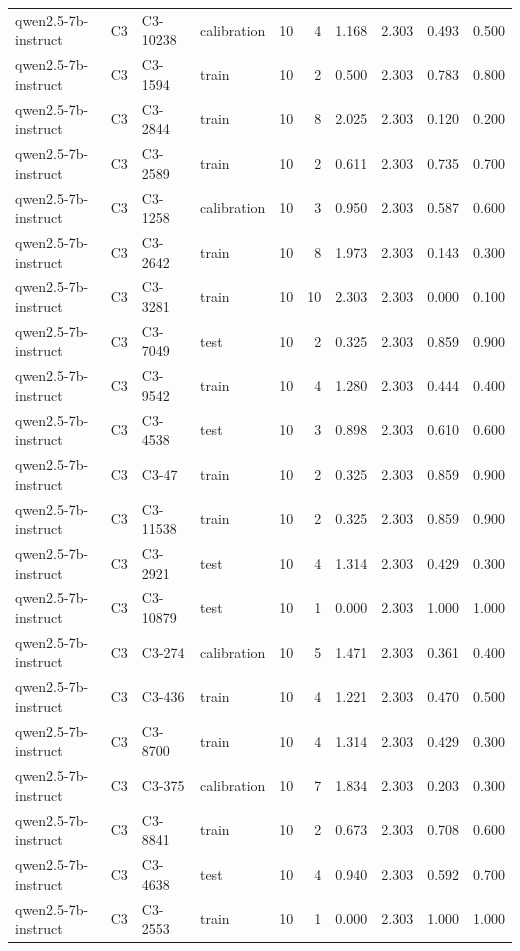 \begin{table}
\begin{tabular}{llllrrrrrr}
qwen2.5-7b-instruct & C3 & C3-10238 & calibration & 10 & 4 & 1.168 & 2.303 & 0.493 & 0.500 \\
qwen2.5-7b-instruct & C3 & C3-1594 & train & 10 & 2 & 0.500 & 2.303 & 0.783 & 0.800 \\
qwen2.5-7b-instruct & C3 & C3-2844 & train & 10 & 8 & 2.025 & 2.303 & 0.120 & 0.200 \\
qwen2.5-7b-instruct & C3 & C3-2589 & train & 10 & 2 & 0.611 & 2.303 & 0.735 & 0.700 \\
qwen2.5-7b-instruct & C3 & C3-1258 & calibration & 10 & 3 & 0.950 & 2.303 & 0.587 & 0.600 \\
qwen2.5-7b-instruct & C3 & C3-2642 & train & 10 & 8 & 1.973 & 2.303 & 0.143 & 0.300 \\
qwen2.5-7b-instruct & C3 & C3-3281 & train & 10 & 10 & 2.303 & 2.303 & 0.000 & 0.100 \\
qwen2.5-7b-instruct & C3 & C3-7049 & test & 10 & 2 & 0.325 & 2.303 & 0.859 & 0.900 \\
qwen2.5-7b-instruct & C3 & C3-9542 & train & 10 & 4 & 1.280 & 2.303 & 0.444 & 0.400 \\
qwen2.5-7b-instruct & C3 & C3-4538 & test & 10 & 3 & 0.898 & 2.303 & 0.610 & 0.600 \\
qwen2.5-7b-instruct & C3 & C3-47 & train & 10 & 2 & 0.325 & 2.303 & 0.859 & 0.900 \\
qwen2.5-7b-instruct & C3 & C3-11538 & train & 10 & 2 & 0.325 & 2.303 & 0.859 & 0.900 \\
qwen2.5-7b-instruct & C3 & C3-2921 & test & 10 & 4 & 1.314 & 2.303 & 0.429 & 0.300 \\
qwen2.5-7b-instruct & C3 & C3-10879 & test & 10 & 1 & 0.000 & 2.303 & 1.000 & 1.000 \\
qwen2.5-7b-instruct & C3 & C3-274 & calibration & 10 & 5 & 1.471 & 2.303 & 0.361 & 0.400 \\
qwen2.5-7b-instruct & C3 & C3-436 & train & 10 & 4 & 1.221 & 2.303 & 0.470 & 0.500 \\
qwen2.5-7b-instruct & C3 & C3-8700 & train & 10 & 4 & 1.314 & 2.303 & 0.429 & 0.300 \\
qwen2.5-7b-instruct & C3 & C3-375 & calibration & 10 & 7 & 1.834 & 2.303 & 0.203 & 0.300 \\
qwen2.5-7b-instruct & C3 & C3-8841 & train & 10 & 2 & 0.673 & 2.303 & 0.708 & 0.600 \\
qwen2.5-7b-instruct & C3 & C3-4638 & test & 10 & 4 & 0.940 & 2.303 & 0.592 & 0.700 \\
qwen2.5-7b-instruct & C3 & C3-2553 & train & 10 & 1 & 0.000 & 2.303 & 1.000 & 1.000 \\

\end{tabular}
\end{table}
